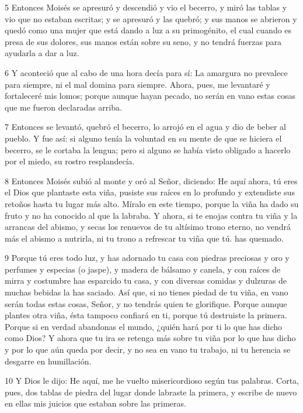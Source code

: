 \par 5 Entonces Moisés se apresuró y descendió y vio el becerro, y miró las tablas y vio que no estaban escritas; y se apresuró y las quebró; y sus manos se abrieron y quedó como una mujer que está dando a luz a su primogénito, el cual cuando es presa de sus dolores, sus manos están sobre su seno, y no tendrá fuerzas para ayudarla a dar a luz.

\par 6 Y aconteció que al cabo de una hora decía para sí: La amargura no prevalece para siempre, ni el mal domina para siempre. Ahora, pues, me levantaré y fortaleceré mis lomos; porque aunque hayan pecado, no serán en vano estas cosas que me fueron declaradas arriba.

\par 7 Entonces se levantó, quebró el becerro, lo arrojó en el agua y dio de beber al pueblo. Y fue así: si alguno tenía la voluntad en su mente de que se hiciera el becerro, se le cortaba la lengua; pero si alguno se había visto obligado a hacerlo por el miedo, su rostro resplandecía.

\par 8 Entonces Moisés subió al monte y oró al Señor, diciendo: He aquí ahora, tú eres el Dios que plantaste esta viña, pusiste sus raíces en lo profundo y extendiste sus retoños hasta tu lugar más alto. Míralo en este tiempo, porque la viña ha dado su fruto y no ha conocido al que la labraba. Y ahora, si te enojas contra tu viña y la arrancas del abismo, y secas los renuevos de tu altísimo trono eterno, no vendrá más el abismo a nutrirla, ni tu trono a refrescar tu viña que tú. has quemado.

\par 9 Porque tú eres todo luz, y has adornado tu casa con piedras preciosas y oro y perfumes y especias (o jaspe), y madera de bálsamo y canela, y con raíces de mirra y costumbre has esparcido tu casa, y con diversas comidas y dulzuras de muchas bebidas la has saciado. Así que, si no tienes piedad de tu viña, en vano serán todas estas cosas, Señor, y no tendrás quien te glorifique. Porque aunque plantes otra viña, ésta tampoco confiará en ti, porque tú destruiste la primera. Porque si en verdad abandonas el mundo, ¿quién hará por ti lo que has dicho como Dios? Y ahora que tu ira se retenga más sobre tu viña por lo que has dicho y por lo que aún queda por decir, y no sea en vano tu trabajo, ni tu herencia se desgarre en humillación.

\par 10 Y Dios le dijo: He aquí, me he vuelto misericordioso según tus palabras. Corta, pues, dos tablas de piedra del lugar donde labraste la primera, y escribe de nuevo en ellas mis juicios que estaban sobre las primeras.

